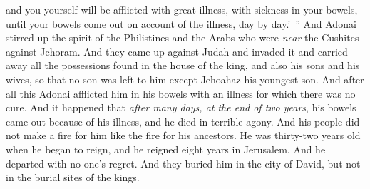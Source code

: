 \begin{biblechapter}
\verse and you yourself will be afflicted with great illness, with sickness in your bowels, until your bowels come out on account of the illness, day by day.’ ”
\verse And Adonai stirred up the spirit of the Philistines and the Arabs who were \textit{near} the Cushites against Jehoram.
\verse And they came up against Judah and invaded it and carried away all the possessions found in the house of the king, and also his sons and his wives, so that no son was left to him except Jehoahaz his youngest son.
\verse And after all this Adonai afflicted him in his bowels with an illness for which there was no cure.
\verse And it happened that \textit{after many days, at the end of two years}, his bowels came out because of his illness, and he died in terrible agony. And his people did not make a fire for him like the fire for his ancestors.
\verse He was thirty-two years old when he began to reign, and he reigned eight years in Jerusalem. And he departed with no one’s regret. And they buried him in the city of David, but not in the burial sites of the kings.
\end{biblechapter}

